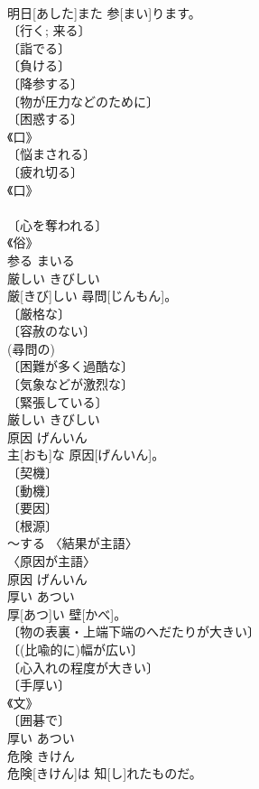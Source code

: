 \documentclass[8pt]{extreport}
\begin{document}
\begin{CJK}{UTF8}{min}
\\	明日[あした]また 参[まい]ります。	
\\	〔行く; 来る〕 
\\	〔詣でる〕 
\\	〔負ける〕 
\\	〔降参する〕 
\\	〔物が圧力などのために〕 
\\	〔困惑する〕 
\\	《口》 
\\	〔悩まされる〕 
\\	〔疲れ切る〕 
\\	《口》 
\\	[⇒へいこう４] 
\\	〔心を奪われる〕 
\\	《俗》 
\\	参る	まいる	
\\	厳しい	きびしい	
\\	厳[きび]しい 尋問[じんもん]。	
\\	〔厳格な〕 
\\	〔容赦のない〕 
\\	(尋問の) 
\\	〔困難が多く過酷な〕 
\\	〔気象などが激烈な〕 
\\	〔緊張している〕 
\\	厳しい	きびしい	
\\	原因	げんいん	
\\	主[おも]な 原因[げんいん]。	
\\	〔契機〕 
\\	〔動機〕 
\\	〔要因〕 
\\	〔根源〕 
\\	～する 〈結果が主語〉 
\\	〈原因が主語〉 
\\	原因	げんいん	
\\	厚い	あつい	
\\	厚[あつ]い 壁[かべ]。	
\\	〔物の表裏・上端下端のへだたりが大きい〕 
\\	〔(比喩的に)幅が広い〕 
\\	〔心入れの程度が大きい〕 
\\	〔手厚い〕 
\\	《文》 
\\	〔囲碁で〕 
\\	厚い	あつい	
\\	危険	きけん	
\\	危険[きけん]は 知[し]れたものだ。	

\end{CJK}
\end{document}

